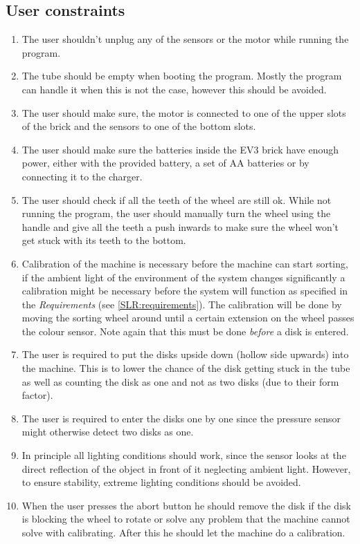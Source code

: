 \subsection{User constraints} \label{SLR:user-constraints}
\begin{enumerate}
	\item The user shouldn't unplug any of the sensors or the motor while running the program.
	\item The tube should be empty when booting the program. Mostly the program can handle it when this is not the case, however this should be avoided.
	\item The user should make sure, the motor is connected to one of the upper slots of the brick and the sensors to one of the bottom slots.
	\item The user should make sure the batteries inside the EV3 brick have enough power, either with the provided battery, a set of AA batteries or by connecting it to the charger.
	\item The user should check if all the teeth of the wheel are still ok. While not running the program, the user should manually turn the wheel using the handle and give all the teeth a push inwards to make sure the wheel won't get stuck with its teeth to the bottom.
	\item Calibration of the machine is necessary before the machine can start sorting, if the ambient light of the environment of the system changes significantly a calibration might be necessary before the system will function as specified in the \emph{Requirements} (see \ref{SLR:requirements}). The calibration will be done by moving the sorting wheel around until a certain extension on the wheel passes the colour sensor. Note again that this must be done \textit{before} a disk is entered.
    \item The user is required to put the disks upside down (hollow side upwards) into the machine. This is to lower the chance of the disk getting stuck in the tube as well as counting the disk as one and not as two disks (due to their form factor).
    \item The user is required to enter the disks one by one since the pressure sensor might otherwise detect two disks as one.
    \item In principle all lighting conditions should work, since the sensor looks at the direct reflection of the object in front of it neglecting ambient light. However, to ensure stability, extreme lighting conditions should be avoided.
    \item When the user presses the abort button he should remove the disk if the disk is blocking the wheel to rotate or solve any problem that the machine cannot solve with calibrating. After this he should let the machine do a calibration. 

\end{enumerate}

